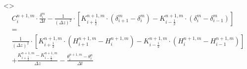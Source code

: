 \documentclass[xcolor=dvipsnames]{beamer}
\newcounter{fourthElement}
\begin{document}
\begin{frame}[t]
  \only<\thefourthElement>{
    \begin{gather*}
      C_i^{n+1,m} \cdot \frac{\delta_i^m}{\Delta t} - \frac{1}{\left(\Delta z\right)^2} \cdot \left[K_{i+\frac{1}{2}}^{n+1,m} \cdot \left(\delta_{i+1}^m - \delta_i^m\right) - K_{i-\frac{1}{2}}^{n+1,m} \cdot \left(\delta_i^m - \delta_{i-1}^m\right)\right] \\[+0.5mm]
      = \\[+0.5mm]
      \frac{1}{\left(\Delta z\right)^2} \cdot \left[K_{i+\frac{1}{2}}^{n+1,m} \cdot \left(H_{i+1}^{n+1,m} - H_i^{n+1,m}\right) - K_{i-\frac{1}{2}}^{n+1,m} \cdot \left(H_{i}^{n+1,m} - H_{i-1}^{n+1,m}\right)\right] \\[+0.5mm]
      + \frac{K_{i+\frac{1}{2}}^{n+1,m} - K_{i-\frac{1}{2}}^{n+1,m}}{\Delta z} - \frac{\theta_i^{n+1,m}-\theta_i^{n}}{\Delta t}
    \end{gather*}}


\end{frame}
\end{document}
